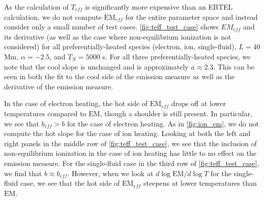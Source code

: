 \documentclass[apj]{emulateapj}
\begin{document}
	\par As the calculation of $T_{eff}$ is significantly more expensive than an EBTEL calculation, we do not compute $\mathrm{EM}_{eff}$ for the entire parameter space and instead consider only a small number of test cases. \autoref{fig:teff_test_case} shows $EM_{eff}$ and its derivative (as well as the case where non-equilibrium ionization is not considered) for all preferentially-heated species (electron, ion, single-fluid), $L=40$ Mm, $\alpha=-2.5$, and $T_N=5000$ s. For all three preferentially-heated species, we note that the cool slope is unchanged and is approximately $a\approx2.3$. This can be seen in both the fit to the cool side of the emission measure as well as the derivative of the emission measure.
	\par In the case of electron heating, the hot side of $\mathrm{EM}_{eff}$ drops off at lower temperatures compared to $\mathrm{EM}$, though a shoulder is still present. In particular, we see that $b_{eff}>b$ for the case of electron heating. As in \autoref{fig:ion_em}, we do not compute the hot slope for the case of ion heating. Looking at both the left and right panels in the middle row of \autoref{fig:teff_test_case}, we see that the inclusion of non-equilibrium ionization in the case of ion heating has little to no effect on the emission measure. For the single-fluid case in the third row of \autoref{fig:teff_test_case}, we find that $b\approx b_{eff}$. However, when we look at $d\log{\mathrm{EM}}/d\log{T}$ for the single-fluid case, we see that the hot side of $\mathrm{EM}_{eff}$ steepens at lower temperatures than $\mathrm{EM}$.
\end{document}
